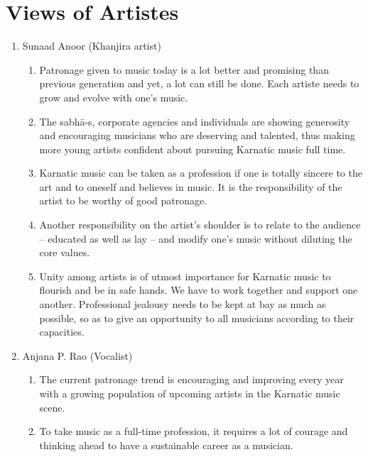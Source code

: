 \section*{Views of Artistes}

\begin{enumerate}
\itemsep=0pt
\item Sunaad Anoor (Khanjira artist)
 
\begin{enumerate}
\itemsep=0pt
\item Patronage given to music today is a lot better and promising than previous generation and yet, a lot can still be done. Each artiste needs to grow and evolve with one’s music.

 \item The sabhā-s, corporate agencies and individuals are showing generosity and encouraging musicians who are deserving and talented, thus making more young artists confident about pursuing Karnatic music full time.

 \item Karnatic music can be taken as a profession if one is totally sincere to the art and to oneself and believes in music. It is the responsibility of the artist to be worthy of good patronage.

 \item Another responsibility on the artist’s shoulder is to relate to the audience – educated as well as lay – and modify one’s music without diluting the core values.

 \item Unity among artists is of utmost importance for Karnatic music to flourish and be in safe hands. We have to work together and support one another. Professional jealousy needs to be kept at bay as much as possible, so as to give an opportunity to all musicians according to their capacities.
\end{enumerate}

 \item Anjana P. Rao (Vocalist)
 
\begin{enumerate}
\itemsep=0pt
\item The current patronage trend is encouraging and improving every year with a growing population of upcoming artists in the Karnatic music scene.

 \item To take music as a full-time profession, it requires a lot of courage and thinking ahead to have a sustainable career as a musician.


\end{enumerate}
\end{enumerate}
